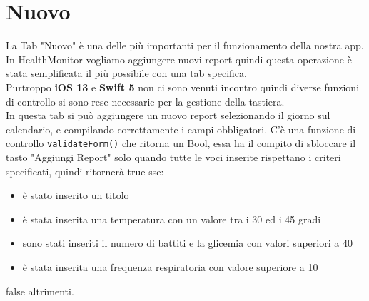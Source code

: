 \documentclass{article}
\begin{document}

\newpage
\section{Nuovo}

La Tab "Nuovo" è una delle più importanti per il funzionamento della nostra app. In HealthMonitor vogliamo aggiungere nuovi report quindi questa operazione è stata semplificata il più possibile con una tab specifica. \\
Purtroppo  \textbf{iOS 13} e \textbf{Swift 5} non ci sono venuti incontro quindi diverse funzioni di controllo si sono rese necessarie per la gestione della tastiera. \\
In questa tab si può aggiungere un nuovo report selezionando il giorno sul calendario, e compilando correttamente i campi obbligatori. C'è una funzione di controllo \texttt{validateForm()} che ritorna un Bool, essa ha il compito di sbloccare il tasto "Aggiungi Report" solo quando tutte le voci inserite rispettano i criteri specificati, quindi ritornerà true sse: 
\begin{itemize}
  \item è stato inserito un titolo
  \item è stata inserita una temperatura con un valore tra i 30 ed i 45 gradi
  \item sono stati inseriti il numero di battiti e la glicemia con valori superiori a 40
  \item è stata inserita una frequenza respiratoria con valore superiore a 10 
\end{itemize}
false altrimenti.
\end{document}

